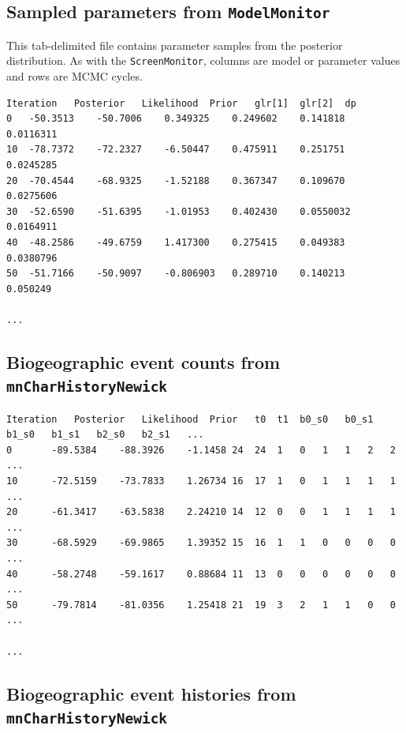 \documentclass[11pt]{article}
\begin{document}
\subsection{Sampled parameters from {\tt ModelMonitor}}

This tab-delimited file contains parameter samples from the posterior distribution.
As with the {\tt ScreenMonitor}, columns are model or parameter values and rows are MCMC cycles.

\begin{framed}
\begin{lstlisting}[basicstyle=\tiny \listingsfont, columns=texcl]
Iteration	Posterior	Likelihood	Prior	glr[1]	glr[2]	dp
0	-50.3513	-50.7006	0.349325	0.249602	0.141818	0.0116311
10	-78.7372	-72.2327	-6.50447	0.475911	0.251751	0.0245285
20	-70.4544	-68.9325	-1.52188	0.367347	0.109670	0.0275606
30	-52.6590	-51.6395	-1.01953	0.402430	0.0550032	0.0164911
40	-48.2586	-49.6759	1.417300	0.275415	0.049383	0.0380796
50	-51.7166	-50.9097	-0.806903	0.289710	0.140213	0.050249

...
\end{lstlisting}
\end{framed}

\subsection{Biogeographic event counts from {\tt mnCharHistoryNewick}}

\begin{framed}
\begin{lstlisting}[basicstyle=\tiny \listingsfont, columns=texcl]
Iteration	Posterior	Likelihood	Prior	t0	t1	b0_s0	b0_s1	b1_s0	b1_s1	b2_s0	b2_s1	...
0		-89.5384	-88.3926	-1.1458	24	24	1	0	1	1	2	2	...
10		-72.5159	-73.7833	1.26734	16	17	1	0	1	1	1	1	...
20		-61.3417	-63.5838	2.24210	14	12	0	0	1	1	1	1	...
30		-68.5929	-69.9865	1.39352	15	16	1	1	0	0	0	0	...
40		-58.2748	-59.1617	0.88684	11	13	0	0	0	0	0	0	...
50		-79.7814	-81.0356	1.25418	21	19	3	2	1	1	0	0	...

...
\end{lstlisting}
\end{framed}

\subsection{Biogeographic event histories from {\tt mnCharHistoryNewick}}
\end{document}
